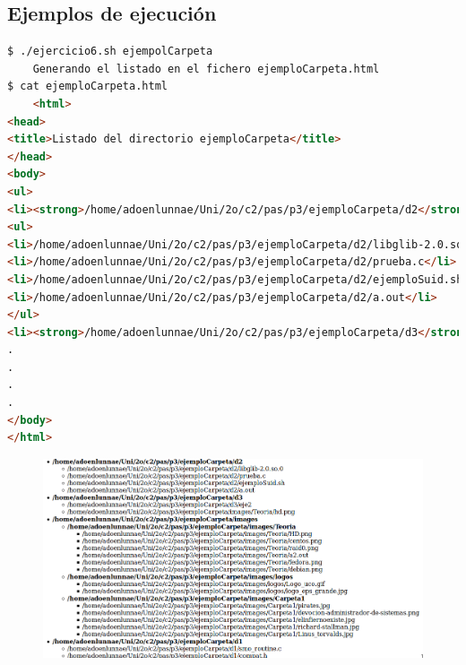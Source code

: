 \documentclass[12pt,a4paper]{article}
\begin{document}
\subsection{Ejemplos de ejecución}
\begin{lstlisting}[basicstyle=\ttfamily\scriptsize,language=HTML]
$ ./ejercicio6.sh ejempolCarpeta
	Generando el listado en el fichero ejemploCarpeta.html
$ cat ejemploCarpeta.html
	<html>
<head>
<title>Listado del directorio ejemploCarpeta</title>
</head>
<body>
<ul>
<li><strong>/home/adoenlunnae/Uni/2o/c2/pas/p3/ejemploCarpeta/d2</strong></li>
<ul>
<li>/home/adoenlunnae/Uni/2o/c2/pas/p3/ejemploCarpeta/d2/libglib-2.0.so.0</li>
<li>/home/adoenlunnae/Uni/2o/c2/pas/p3/ejemploCarpeta/d2/prueba.c</li>
<li>/home/adoenlunnae/Uni/2o/c2/pas/p3/ejemploCarpeta/d2/ejemploSuid.sh</li>
<li>/home/adoenlunnae/Uni/2o/c2/pas/p3/ejemploCarpeta/d2/a.out</li>
</ul>
<li><strong>/home/adoenlunnae/Uni/2o/c2/pas/p3/ejemploCarpeta/d3</strong></li>
.
.
.
.
</body>
</html>
\end{lstlisting}

\begin{figure}[h]
\includegraphics[width=\textwidth]{CapturaHTML.png} 
\end{figure}
\end{document}
